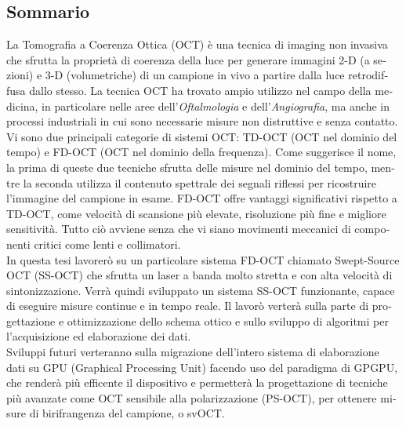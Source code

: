 \begin{otherlanguage}{italian}
\chapter*{Sommario}
La Tomografia a Coerenza Ottica (\acs{OCT}) è una tecnica di imaging non invasiva che sfrutta la proprietà di coerenza della luce per generare immagini 2-D (a sezioni) e 3-D (volumetriche) di un campione in vivo a partire dalla luce retrodiffusa dallo stesso. La tecnica OCT ha trovato ampio utilizzo nel campo della medicina, in particolare nelle aree dell'\emph{Oftalmologia} e dell'\emph{Angiografia}, ma anche in processi industriali in cui sono necessarie misure non distruttive e senza
contatto. \\

\noindent Vi sono due principali categorie di sistemi OCT: TD-OCT (OCT nel dominio del tempo) e FD-OCT (OCT nel dominio della frequenza). Come suggerisce il nome, la prima di queste due tecniche sfrutta delle misure nel dominio del tempo, mentre la seconda utilizza il contenuto spettrale dei segnali riflessi per ricostruire l'immagine del campione in esame. FD-OCT offre vantaggi significativi rispetto a TD-OCT, come velocità di scansione più elevate, risoluzione più fine e migliore
sensitività. Tutto ciò avviene senza che vi siano movimenti meccanici di componenti critici come lenti e collimatori. \\

\noindent In questa tesi lavorerò su un particolare sistema FD-OCT chiamato Swept-Source OCT (\ac{SS-OCT}) che sfrutta un laser a banda molto stretta e con alta velocità di sintonizzazione. Verrà quindi sviluppato un sistema SS-OCT funzionante, capace di eseguire misure continue e in tempo reale. Il lavorò verterà sulla parte di progettazione e ottimizzazione dello schema ottico e sullo sviluppo di algoritmi per l'acquisizione ed elaborazione dei dati. \\

\noindent Sviluppi futuri verteranno sulla migrazione dell'intero sistema di elaborazione dati su GPU (Graphical Processing Unit) facendo uso del paradigma di \acf {GPGPU}, che renderà più efficente il dispositivo e permetterà la progettazione di tecniche più avanzate come OCT sensibile alla polarizzazione (\acs{PS-OCT}), per ottenere misure di birifrangenza del campione, o \acf{svOCT}.
\end{otherlanguage}

\endgroup

\vfill
